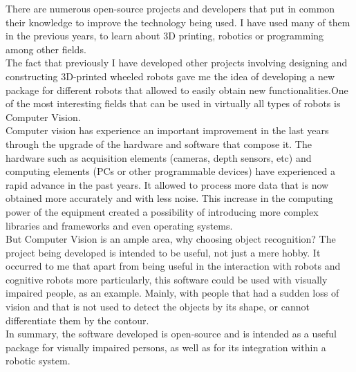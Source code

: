 There are numerous open-source projects and developers that put in common their knowledge to improve the technology being used. I have used many of them in the previous years, to learn about 3D printing, robotics or programming among other fields. 
\\

The fact that previously I have developed other projects involving designing and constructing 3D-printed wheeled robots gave me the idea of developing a new package for different robots that allowed to easily obtain new functionalities.One of the most interesting fields that can be used in virtually all types of robots is Computer Vision. 
\\

Computer vision has experience an important improvement in the last years through the upgrade of the hardware and software that compose it. The hardware such as acquisition elements (cameras, depth sensors, etc) and computing elements (PCs or other programmable devices) have experienced a rapid advance in the past years. It allowed to process more data that is now obtained more accurately and with less noise. This increase in the computing power of the equipment created a possibility of introducing more complex libraries and frameworks and even operating systems. 
\\

But Computer Vision is an ample area, why choosing object recognition? The project being developed is intended to be useful, not just a mere hobby. It occurred to me that apart from being useful in the interaction with robots and cognitive robots more particularly, this software could be used with visually impaired people, as an example. Mainly, with people that had a sudden loss of vision and that is not used to detect the objects by its shape, or cannot differentiate them by the contour. 
\\

In summary, the software developed is open-source and is intended as a useful package for visually impaired persons, as well as for its integration within a robotic system. 

\newpage
 
\newpage

